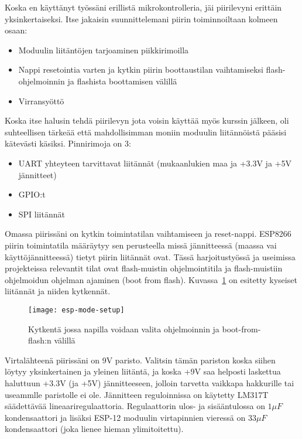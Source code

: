 Koska en käyttänyt työssäni erillistä mikrokontrolleria, jäi piirilevyni
erittäin yksinkertaiseksi. Itse jakaisin suunnittelemani piirin toiminnoiltaan
kolmeen osaan:
\begin{itemize}
  \item Moduulin liitäntöjen tarjoaminen piikkirimoilla
  \item Nappi resetointia varten ja kytkin piirin boottaustilan vaihtamiseksi
    flash-ohjelmoinnin ja flashista boottamisen välillä
  \item Virransyöttö
\end{itemize}

Koska itse halusin tehdä piirilevyn jota voisin käyttää myös kurssin jälkeen,
oli suhteellisen tärkeää että mahdollisimman moniin moduulin liitännöistä
pääsisi kätevästi käsiksi. Pinnirimoja on 3:
\begin{itemize}
  \item UART yhteyteen tarvittavat liitännät (mukaanlukien maa ja +3.3V ja +5V
    jännitteet)
  \item GPIO:t
  \item SPI liitännät
\end{itemize}

Omassa piirissäni on kytkin toimintatilan vaihtamiseen ja reset-nappi.
ESP8266 piirin toimintatila määräytyy sen perusteella missä jännitteessä
(maassa vai käyttöjännitteessä) tietyt piirin liitännät ovat. Tässä
harjoitustyössä ja useimissa projekteissa relevantit tilat ovat flash-muistin
ohjelmointitila ja flash-muistiin ohjelmoidun ohjelman ajaminen (boot from
flash). Kuvassa~\ref{fig:esp-tila-pinnit} on esitetty kyseiset liitännät ja
niiden kytkennät.
\begin{figure}[H]
  \centering
  \texttt{[image: esp-mode-setup]}
  \caption{Kytkentä jossa napilla voidaan valita ohjelmoinnin ja boot-from-flash:n
    välillä~\cite{hackaday}}
\label{fig:esp-tila-pinnit}
\end{figure}

Virtalähteenä piirissäni on 9V paristo. Valitsin tämän pariston koska siihen
löytyy yksinkertainen ja yleinen liitäntä, ja koska +9V saa helposti laskettua
haluttuun +3.3V (ja +5V) jännitteeseen, jolloin tarvetta vaikkapa hakkurille
tai useammlle paristolle ei ole. Jännitteen reguloinnissa on käytetty LM317T
säädettävää lineaariregulaattoria. Regulaattorin ulos- ja sisääntulossa on
\(1\mu{}F\) kondensaattori ja lisäksi ESP-12 moduulin virtapinnien vieressä on
\(33\mu{}F\) kondensaattori (joka lienee hieman ylimitoitettu).

